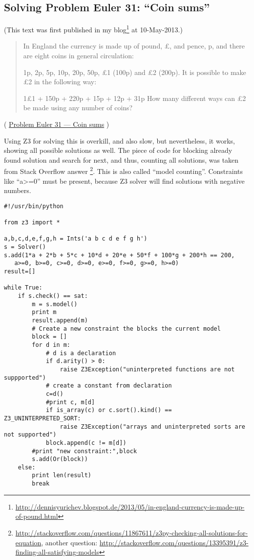 \subsection{Solving Problem Euler 31: ``Coin sums''}

(This text was first published in my blog\footnote{\url{http://dennisyurichev.blogspot.de/2013/05/in-england-currency-is-made-up-of-pound.html}} at 10-May-2013.)

\begin{framed}
\begin{quotation}
In England the currency is made up of pound, £, and pence, p, and there are eight coins in general circulation:

1p, 2p, 5p, 10p, 20p, 50p, £1 (100p) and £2 (200p).
It is possible to make £2 in the following way:

1£1 + 150p + 220p + 15p + 12p + 31p
How many different ways can £2 be made using any number of coins?
\end{quotation}
\end{framed}
( \href{http://projecteuler.net/problem=31}{Problem Euler 31 --- Coin sums} )

\label{SMTEnumerate}
Using Z3 for solving this is overkill, and also slow, but nevertheless, it works, showing all possible solutions as well.
The piece of code for blocking already found solution and search for next, and thus, counting all solutions, was taken from Stack Overflow answer
\footnote{\url{http://stackoverflow.com/questions/11867611/z3py-checking-all-solutions-for-equation}, 
another question: \url{http://stackoverflow.com/questions/13395391/z3-finding-all-satisfying-models}}.
This is also called ``model counting''.
Constraints like ``a>=0'' must be present, because Z3 solver will find solutions with negative numbers.

\begin{lstlisting}
#!/usr/bin/python

from z3 import *

a,b,c,d,e,f,g,h = Ints('a b c d e f g h')
s = Solver()
s.add(1*a + 2*b + 5*c + 10*d + 20*e + 50*f + 100*g + 200*h == 200, 
   a>=0, b>=0, c>=0, d>=0, e>=0, f>=0, g>=0, h>=0)
result=[]

while True:
    if s.check() == sat:
        m = s.model()
        print m
        result.append(m)
        # Create a new constraint the blocks the current model
        block = []
        for d in m:
            # d is a declaration
            if d.arity() > 0:
                raise Z3Exception("uninterpreted functions are not suppported")
            # create a constant from declaration
            c=d()
            #print c, m[d]
            if is_array(c) or c.sort().kind() == Z3_UNINTERPRETED_SORT:
                raise Z3Exception("arrays and uninterpreted sorts are not supported")
            block.append(c != m[d])
        #print "new constraint:",block
        s.add(Or(block))
    else:
        print len(result)
        break
\end{lstlisting}

